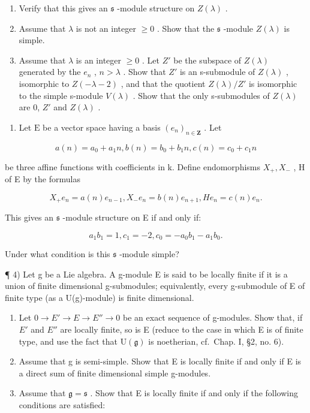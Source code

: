 \begin{enumerate}
\def\labelenumi{\alph{enumi})}
\item
  Verify that this gives an \(\mathfrak{s}\) -module structure on \(Z(\lambda)\) .
\item
  Assume that \(\lambda\) is not an integer \(\geq 0\) . Show that the \(\mathfrak{s}\) -module \(Z(\lambda)\) is simple.
\item
  Assume that \(\lambda\) is an integer \(\geq 0\) . Let \(Z'\) be the subspace of \(Z(\lambda)\) generated by the \(e_{n}\) , \(n > \lambda\) . Show that \(Z'\) is an s-submodule of \(Z(\lambda)\) , isomorphic to \(Z(-\lambda - 2)\) , and that the quotient \(Z(\lambda)/Z'\) is isomorphic to the simple s-module \(V(\lambda)\) . Show that the only s-submodules of \(Z(\lambda)\) are 0, \(Z'\) and \(Z(\lambda)\) .
\end{enumerate}

\begin{enumerate}
\def\labelenumi{\arabic{enumi})}
\setcounter{enumi}{2}
\tightlist
\item
  Let \(\mathrm{E}\) be a vector space having a basis \((e_n)_{n\in \mathbf{Z}}\) . Let
\end{enumerate}

\[
a (n) = a _ {0} + a _ {1} n, b (n) = b _ {0} + b _ {1} n, c (n) = c _ {0} + c _ {1} n
\]

be three affine functions with coefficients in k. Define endomorphisms \(X_{+}, X_{-}\) , H of E by the formulas

\[
X _ {+} e _ {n} = a (n) e _ {n - 1}, X _ {-} e _ {n} = b (n) e _ {n + 1}, H e _ {n} = c (n) e _ {n}.
\]

This gives an \(\mathfrak{s}\) -module structure on E if and only if:

\[
a _ {1} b _ {1} = 1, c _ {1} = - 2, c _ {0} = - a _ {0} b _ {1} - a _ {1} b _ {0}.
\]

Under what condition is this \(\mathfrak{s}\) -module simple?

¶ 4) Let g be a Lie algebra. A g-module E is said to be locally finite if it is a union of finite dimensional g-submodules; equivalently, every g-submodule of E of finite type (as a U(g)-module) is finite dimensional.

\begin{enumerate}
\def\labelenumi{\alph{enumi})}
\item
  Let \(0 \rightarrow E' \rightarrow E \rightarrow E'' \rightarrow 0\) be an exact sequence of g-modules. Show that, if \(E'\) and \(E''\) are locally finite, so is E (reduce to the case in which E is of finite type, and use the fact that \(\mathrm{U}(\mathfrak{g})\) is noetherian, cf.~Chap. I, §2, no. 6).
\item
  Assume that g is semi-simple. Show that E is locally finite if and only if E is a direct sum of finite dimensional simple g-modules.
\item
  Assume that \(\mathfrak{g} = \mathfrak{s}\) . Show that E is locally finite if and only if the following conditions are satisfied:
\end{enumerate}

